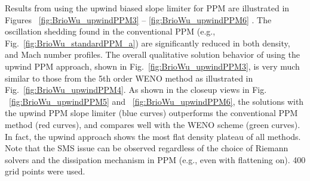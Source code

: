 
\makeUsNormal

Results from using the upwind biased slope limiter for PPM are
illustrated in Figures ~\ref{fig:BrioWu_upwindPPM3} -- \ref{fig:BrioWu_upwindPPM6} .  The oscillation
shedding found in the conventional PPM  (e.g., Fig.~{\ref{fig:BrioWu_standardPPM_a}}) are significantly
reduced in both density, and Mach number profiles. 
The overall qualitative solution behavior of using the upwind PPM approach, shown in 
Fig.~\ref{fig:BrioWu_upwindPPM3}, 
is very much similar to those from the 5th order WENO method as illustrated in
Fig.~\ref{fig:BrioWu_upwindPPM4}.
As shown in the closeup views in Fig. ~\ref{fig:BrioWu_upwindPPM5} and  ~\ref{fig:BrioWu_upwindPPM6}, 
the solutions with the upwind PPM slope limiter (blue curves) outperforms 
the conventional PPM method (red curves), and compares well with the WENO scheme (green curves). 
In fact, the upwind approach shows the most flat
density plateau of all methods. Note that the SMS issue can be observed regardless of
the choice of Riemann solvers and the dissipation mechanism in PPM (e.g., even with flattening on).
400 grid points were used.

